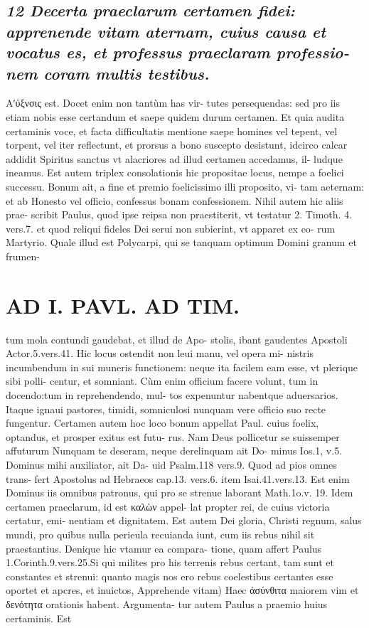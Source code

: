 \documentclass{article}
\begin{document}
\begin{pages}
\subsection*{\textit{12 Decerta praeclarum certamen fidei: apprenende vitam aternam, cuius causa et vocatus es, et professus praeclaram professio- nem coram multis testibus. }}\pstart Αʹὐξνσις est. Docet enim non tantùm has vir- tutes persequendas: sed pro iis etiam nobis esse certandum et saepe quidem durum certamen. Et quia audita certaminis voce, et facta difficultatis mentione saepe homines vel tepent, vel torpent, vel iter reflectunt, et prorsus a bono suscepto desistunt, idcirco calcar addidit Spiritus sanctus vt alacriores ad illud certamen accedamus, il- ludque ineamus. Est autem triplex consolationis hic propositae locus, nempe a foelici successu. Bonum ait, a fine et premio foelicissimo illi proposito, vi- tam aeternam: et ab Honesto vel officio, confessus bonam confessionem. Nihil autem hic aliis prae- scribit Paulus, quod ipse reipsa non praestiterit, vt testatur 2. Timoth. 4. vers.7. et quod reliqui fideles Dei serui non subierint, vt apparet ex eo- rum Martyrio. Quale illud est Polycarpi, qui se tanquam optimum Domini granum et frumen-  \pend
\section*{AD I. PAVL. AD TIM. }
\marginpar{[ p.114  ]}\pstart tum mola contundi gaudebat, et illud de Apo- stolis, ibant gaudentes Apostoli Actor.5.vers.41. Hic locus ostendit non leui manu, vel opera mi- nistris incumbendum in sui muneris functionem: neque ita facilem eam esse, vt plerique sibi polli- centur, et somniant. Cùm enim officium facere volunt, tum in docendo:tum in reprehendendo, mul- tos expenuntur nabentque aduersarios. Itaque ignaui pastores, timidi, somniculosi nunquam vere officio suo recte fungentur.  \pend\pstart Certamen autem hoc loco bonum appellat Paul. cuius foelix, optandus, et prosper exitus est futu- rus. Nam Deus pollicetur se suissemper affuturum Nunquam te deseram, neque derelinquam ait Do- minus Ios.1, v.5. Dominus mihi auxiliator, ait Da- uid Psalm.118 vers.9. Quod ad pios omnes trans- fert Apostolus ad Hebraeos cap.13. vers.6. item Isai.41.vers.13. Est enim Dominus iis omnibus patronus, qui pro se strenue laborant Math.1o.v. 19. Idem certamen praeclarum, id est καλὼν appel- lat propter rei, de cuius victoria certatur, emi- nentiam et dignitatem. Est autem Dei gloria, Christi regnum, salus mundi, pro quibus nulla perieula recuianda iunt, cum iis rebus nihil sit praestantius. Denique hic vtamur ea compara- tione, quam affert Paulus 1.Corinth.9.vers.25.Si qui milites pro his terrenis rebus certant, tam sunt et constantes et strenui: quanto magis nos ero rebus coelestibus certantes esse oportet et apcres, et inuictos,  \pend\pstart Apprehende vitam) Haec ἀσύνθιτα maiorem vim et δενότητα orationis habent. Argumenta- tur autem Paulus a praemio huius certaminis. Est  \pend

\end{pages}
\end{document}
